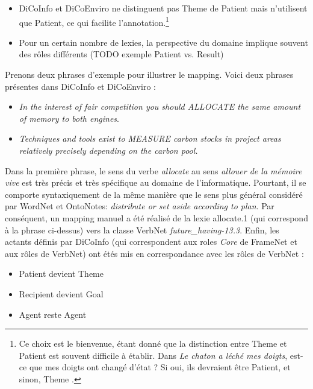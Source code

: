 \begin{itemize}

    \item DiCoInfo et DiCoEnviro ne distinguent pas Theme de Patient mais
n'utilisent que Patient, ce qui facilite l'annotation.\footnote{Ce choix est le
bienvenue, étant donné que la distinction entre Theme et Patient est souvent
difficile à établir. Dans \textit{Le chaton a léché mes doigts}, est-ce que mes
doigts ont changé d'état ? Si oui, ils devraient être Patient, et sinon, Theme
\citep[p.~5]{palmer2010semantic}.}

    \item Pour un certain nombre de lexies, la perspective du domaine implique
souvent des rôles différents (TODO exemple Patient vs. Result)

\end{itemize}

Prenons deux phrases d'exemple pour illustrer le mapping. Voici deux phrases
présentes dans DiCoInfo et DiCoEnviro :

\begin{itemize}

    \item \emph{In the interest of fair competition you should ALLOCATE the
        same amount of memory to both engines}.

    \item \emph{Techniques and tools exist to MEASURE carbon stocks in project areas
        relatively precisely depending on the carbon pool.}

\end{itemize}

Dans la première phrase, le sens du verbe \textit{allocate} au sens
\emph{allouer de la mémoire vive} est très précis et très spécifique au domaine
de l'informatique. Pourtant, il se comporte syntaxiquement de la même manière
que le sens plus général considéré par WordNet et OntoNotes: \textit{distribute
or set aside according to plan}. Par conséquent, un mapping manuel a été
réalisé de la lexie allocate.1 (qui correspond à la phrase ci-dessus) vers la
classe VerbNet \textit{future\_having-13.3}. Enfin, les actants définis par
DiCoInfo (qui correspondent aux roles \textit{Core} de FrameNet et aux rôles de
VerbNet) ont étés mis en correspondance avec les rôles de VerbNet :

\begin{itemize}
    \item Patient devient Theme
    \item Recipient devient Goal
    \item Agent reste Agent
\end{itemize}

